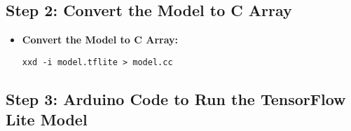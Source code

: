 	\subsection{Step 2: Convert the Model to C Array}
	
	\begin{itemize}
		\item \textbf{Convert the Model to C Array:}
		\begin{lstlisting}[caption={Converting the Model to C Array}, label={code:convert-to-c-array}, style=pythonstyle]
			xxd -i model.tflite > model.cc
		\end{lstlisting}
	\end{itemize}
	
	\subsection{Step 3: Arduino Code to Run the TensorFlow Lite Model}
	
